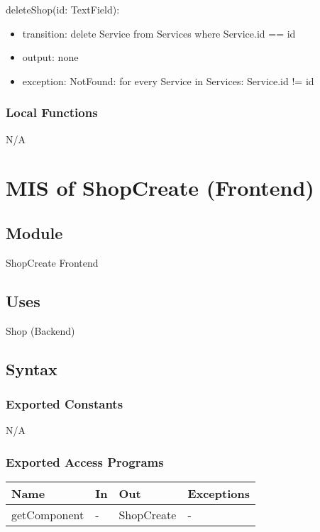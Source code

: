 \documentclass[12pt, titlepage]{article}
\begin{document}
\noindent deleteShop(id: TextField):
\begin{itemize}
    \item transition: delete Service from Services where Service.id == id
    \item output: none
    \item exception: NotFound: for every Service in Services: Service.id != id
\end{itemize}

\subsubsection{Local Functions}

N/A

\newpage

\section{MIS of ShopCreate (Frontend)} \label{Module}

\subsection{Module}

ShopCreate Frontend

\subsection{Uses}
Shop (Backend)

\subsection{Syntax}

\subsubsection{Exported Constants}

N/A

\subsubsection{Exported Access Programs}

\begin{center}
    \begin{tabular}{p{2cm} p{4cm} p{4cm} p{2cm}}
    \hline
    \textbf{Name} & \textbf{In} & \textbf{Out} & \textbf{Exceptions} \\
    \hline
    getComponent & - & ShopCreate & - \\
    \hline
    \end{tabular}
\end{center}
\end{document}
